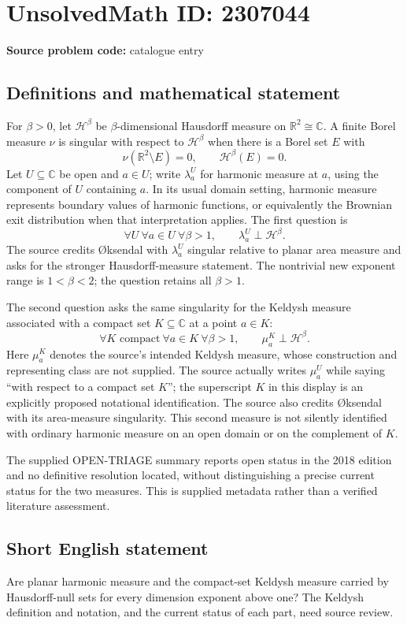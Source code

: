 \documentclass[11pt]{article}
\newcommand{\R}{\mathbb{R}}
\newcommand{\C}{\mathbb{C}}
\begin{document}
\section*{UnsolvedMath ID: 2307044}
\textbf{Source problem code:} catalogue entry
\subsection{Definitions and mathematical statement}
For \(\beta>0\), let \(\mathcal H^\beta\) be \(\beta\)-dimensional Hausdorff measure on \(\R^2\cong\C\). A finite Borel measure \(\nu\) is singular with respect to \(\mathcal H^\beta\) when there is a Borel set \(E\) with
\[
\nu(\R^2\setminus E)=0,\qquad \mathcal H^\beta(E)=0.
\]
Let \(U\subseteq\C\) be open and \(a\in U\); write \(\lambda_a^U\) for harmonic measure at \(a\), using the component of \(U\) containing \(a\). In its usual domain setting, harmonic measure represents boundary values of harmonic functions, or equivalently the Brownian exit distribution when that interpretation applies. The first question is
\[
\forall U\ \forall a\in U\ \forall\beta>1,\qquad
\lambda_a^U\perp\mathcal H^\beta.
\]
The source credits \O{}ksendal with \(\lambda_a^U\) singular relative to planar area measure and asks for the stronger Hausdorff-measure statement. The nontrivial new exponent range is \(1<\beta<2\); the question retains all \(\beta>1\).

The second question asks the same singularity for the Keldysh measure associated with a compact set \(K\subseteq\C\) at a point \(a\in K\):
\[
\forall K\text{ compact}\ \forall a\in K\ \forall\beta>1,\qquad
\mu_a^K\perp\mathcal H^\beta.
\]
Here \(\mu_a^K\) denotes the source's intended Keldysh measure, whose construction and representing class are not supplied. The source actually writes \(\mu_a^U\) while saying ``with respect to a compact set \(K\)''; the superscript \(K\) in this display is an explicitly proposed notational identification. The source also credits \O{}ksendal with its area-measure singularity. This second measure is not silently identified with ordinary harmonic measure on an open domain or on the complement of \(K\).

The supplied OPEN-TRIAGE summary reports open status in the 2018 edition and no definitive resolution located, without distinguishing a precise current status for the two measures. This is supplied metadata rather than a verified literature assessment.
\subsection{Short English statement}
Are planar harmonic measure and the compact-set Keldysh measure carried by Hausdorff-null sets for every dimension exponent above one? The Keldysh definition and notation, and the current status of each part, need source review.
\end{document}
